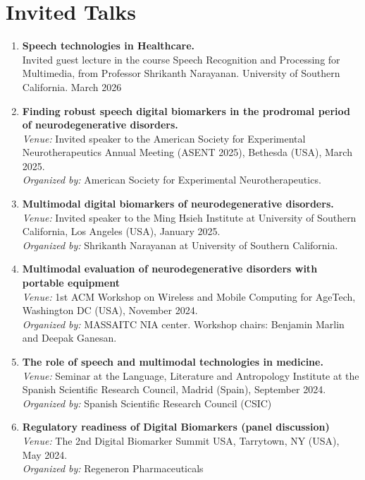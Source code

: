 \section{Invited Talks}

\begin{enumerate}
  \item \textbf{Speech technologies in Healthcare.}\\ Invited guest lecture in the course Speech Recognition and Processing for Multimedia, from Professor Shrikanth Narayanan. University of Southern California. March 2026
  \item \textbf{Finding robust speech digital biomarkers in the prodromal period of neurodegenerative disorders.}\\ \textit{Venue:} Invited speaker to the American Society for Experimental Neurotherapeutics Annual Meeting (ASENT 2025), Bethesda (USA), March 2025.\\ \textit{Organized by:} American Society for Experimental Neurotherapeutics.
  \item \textbf{Multimodal digital biomarkers of neurodegenerative disorders.}\\ \textit{Venue:} Invited speaker to the Ming Hsieh Institute at University of Southern California, Los Angeles (USA), January 2025.\\ \textit{Organized by:} Shrikanth Narayanan at University of Southern California.
  \item \textbf{Multimodal evaluation of neurodegenerative disorders with portable equipment}\\ \textit{Venue:} 1st ACM Workshop on Wireless and Mobile Computing for AgeTech, Washington DC (USA), November 2024.\\ \textit{Organized by:} MASSAITC NIA center. Workshop chairs: Benjamin Marlin and Deepak Ganesan.
  \item \textbf{The role of speech and multimodal technologies in medicine.}\\ \textit{Venue:} Seminar at the Language, Literature and Antropology Institute at the Spanish Scientific Research Council, Madrid (Spain), September 2024.\\ \textit{Organized by:} Spanish Scientific Research Council (CSIC)
  \item \textbf{Regulatory readiness of Digital Biomarkers (panel discussion)}\\ \textit{Venue:} The 2nd Digital Biomarker Summit USA, Tarrytown, NY (USA), May 2024.\\ \textit{Organized by:} Regeneron Pharmaceuticals

\end{enumerate}
